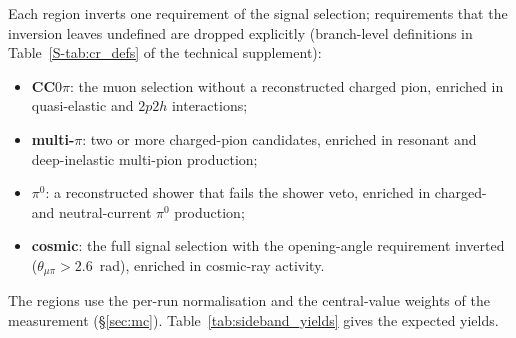 \documentclass[11pt,a4paper]{article}
\newcommand{\suppref}[2]{#1~\ref{S-#2} of the technical supplement}
\begin{document}
Each region inverts one requirement of the signal selection; requirements that the inversion leaves
undefined are dropped explicitly (branch-level definitions in \suppref{Table}{tab:cr_defs}):
\begin{itemize}
  \item \textbf{CC$0\pi$}: the muon selection without a reconstructed charged pion, enriched in
    quasi-elastic and $2p2h$ interactions;
  \item \textbf{multi-$\pi$}: two or more charged-pion candidates, enriched in resonant and
    deep-inelastic multi-pion production;
  \item \textbf{$\pi^0$}: a reconstructed shower that fails the shower veto, enriched in charged-
    and neutral-current $\pi^0$ production;
  \item \textbf{cosmic}: the full signal selection with the opening-angle requirement inverted
    ($\theta_{\mu\pi}>2.6$~rad), enriched in cosmic-ray activity.
\end{itemize}
The regions use the per-run normalisation and the central-value weights of the measurement
(\S\ref{sec:mc}). Table~\ref{tab:sideband_yields} gives the expected yields.
\end{document}
